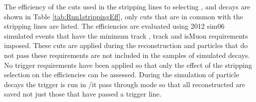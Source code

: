 The efficiency of the cuts used in the stripping lines to selecting \bmumu, \bhh and \bujpsik decays are shown in Table \ref{tab:Run1strippingEff}, only cuts that are in common with the \bmumu stripping lines are listed. The efficiencies are evaluated using 2012 sim06 simulated events that have the minimum track \pt, track \chisqd and isMuon requirements imposed. These cuts are applied during the reconstruction and particles that do not pass these requirements are not included in the samples of simulated decays. No trigger requirements have been applied so that only the effect of the stripping selection on the efficiencies can be assessed. During the simulation of particle decays the trigger is run in {/it pass through} mode so that all reconstructed are saved not just those that have passed a trigger line. 



